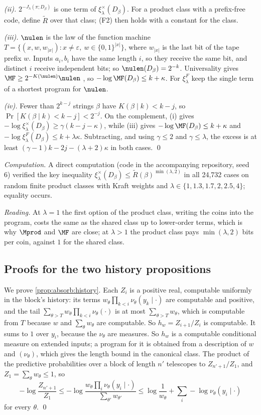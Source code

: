 \emph{(ii).} $2^{-J_\lambda(\pi;D_\beta)}$ is one term of $\xi^\times_\lambda(D_\beta)$. For a product class with a prefix-free code, define $\tilde R$ over that class; (F2) then holds with a constant for the class.

\emph{(iii).} $\nulen$ is the law of the function machine $T=\{(x,w,w_{|x|}):x\ne\varepsilon,\ w\in\{0,1\}^{|x|}\}$, where $w_{|x|}$ is the last bit of the tape prefix $w$. Inputs $a_i,b_i$ have the same length $i$, so they receive the same bit, and distinct $i$ receive independent bits; so $\nulen(D_\beta)=2^{-k}$. Universality gives $\MF\ge2^{-K(\nulen)}\nulen$ \citep{claudeSFI2026fundamentals}, so $-\log\MF(D_\beta)\le k+\kappa$. For $\xi^F_\lambda$ keep the single term of a shortest program for $\nulen$.

\emph{(iv).} Fewer than $2^{k-j}$ strings $\beta$ have $K(\beta\mid k)<k-j$, so $\Pr[K(\beta\mid k)<k-j]<2^{-j}$. On the complement, (i) gives $-\log\xi^\times_\lambda(D_\beta)\ge\gamma(k-j-\kappa)$, while (iii) gives $-\log\MF(D_\beta)\le k+\kappa$ and $-\log\xi^F_\lambda(D_\beta)\le k+\lambda\kappa$. Subtracting, and using $\gamma\le2$ and $\gamma\le\lambda$, the excess is at least $(\gamma-1)k-2j-(\lambda+2)\kappa$ in both cases. \qed

\emph{Computation.} A direct computation (code in the accompanying repository, seed 6) verified the key inequality $\xi^\times_\lambda(D_\beta)\le\tilde R(\beta)^{\min(\lambda,2)}$ in all 24{,}732 cases on random finite product classes with Kraft weights and $\lambda\in\{1,1.3,1.7,2,2.5,4\}$; equality occurs.

\emph{Reading.} At $\lambda=1$ the first option of the product class, writing the coins into the program, costs the same as the shared class up to lower-order terms, which is why $\Mprod$ and $\MF$ are close; at $\lambda>1$ the product class pays $\min(\lambda,2)$ bits per coin, against $1$ for the shared class.

\subsection{Proofs for the two history propositions}\label{app:absorb:history}

We prove \cref{prop:absorb:history}. Each $Z_i$ is a positive real, computable uniformly in the block's history: its terms $w_\theta\prod_{k<i}\nu_\theta(y_k\mid\cdot)$ are computable and positive, and the tail $\sum_{\theta>T}w_\theta\prod_{k<i}\nu_\theta(\cdot)$ is at most $\sum_{\theta>T}w_\theta$, which is computable from $T$ because $w$ and $\sum_\theta w_\theta$ are computable. So $h_w=Z_{i+1}/Z_i$ is computable. It sums to $1$ over $y_i$, because the $\nu_\theta$ are measures. So $h_w$ is a computable conditional measure on extended inputs; a program for it is obtained from a description of $w$ and $(\nu_\theta)$, which gives the length bound in the canonical class. The product of the predictive probabilities over a block of length $n'$ telescopes to $Z_{n'+1}/Z_1$, and $Z_1=\sum_\theta w_\theta\le1$, so
\[
-\log\frac{Z_{n'+1}}{Z_1}\le-\log\frac{w_\theta\prod_i\nu_\theta(y_i\mid\cdot)}{\sum_{\theta'}w_{\theta'}}\le\log\frac1{w_\theta}+\sum_i-\log\nu_\theta(y_i\mid\cdot)
\]
for every $\theta$. \qed

